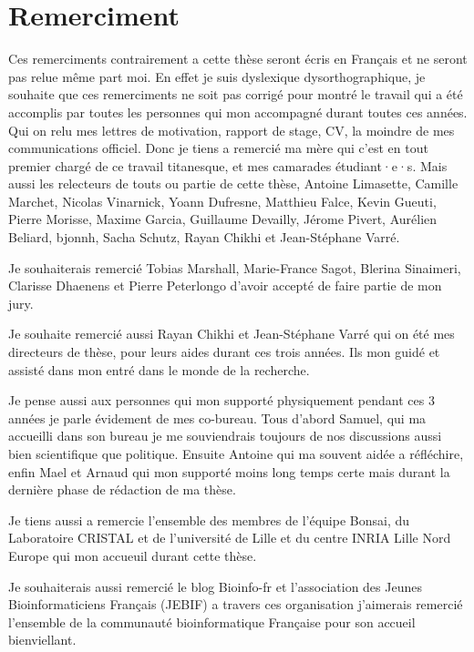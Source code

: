 \documentclass[main.tex]{subfiles}
\begin{document}
\section*{Remerciment}
%

Ces remerciments contrairement a cette thèse seront écris en Français et ne seront pas relue même part moi. En effet je suis dyslexique dysorthographique, je souhaite que ces remerciments ne soit pas corrigé pour montré le travail qui a été accomplis par toutes les personnes qui mon accompagné durant toutes ces années. Qui on relu mes lettres de motivation, rapport de stage, CV, la moindre de mes communications officiel. Donc je tiens a remercié ma mère qui c'est en tout premier chargé de ce travail titanesque, et mes camarades étudiant·e·s. Mais aussi les relecteurs de touts ou partie de cette thèse, Antoine Limasette, Camille Marchet, Nicolas Vinarnick, Yoann Dufresne, Matthieu Falce, Kevin Gueuti, Pierre Morisse, Maxime Garcia, Guillaume Devailly, Jérome Pivert, Aurélien Beliard, bjonnh, Sacha Schutz, Rayan Chikhi et Jean-Stéphane Varré.

Je souhaiterais remercié Tobias Marshall, Marie-France Sagot, Blerina Sinaimeri, Clarisse Dhaenens et Pierre Peterlongo d'avoir accepté de faire partie de mon jury.

Je souhaite remercié aussi Rayan Chikhi et Jean-Stéphane Varré qui on été mes directeurs de thèse, pour leurs aides durant ces trois années. Ils mon guidé et assisté dans mon entré dans le monde de la recherche.

Je pense aussi aux personnes qui mon supporté physiquement pendant ces 3 années je parle évidement de mes co-bureau. Tous d'abord Samuel, qui ma accueilli dans son bureau je me souviendrais toujours de nos discussions aussi bien scientifique que politique. Ensuite Antoine qui ma souvent aidée a réfléchire, enfin Mael et Arnaud qui mon supporté moins long temps certe mais durant la dernière phase de rédaction de ma thèse.

Je tiens aussi a remercie l'ensemble des membres de l'équipe Bonsai, du Laboratoire CRISTAL et de l'université de Lille et du centre INRIA Lille Nord Europe qui mon accueuil durant cette thèse.

Je souhaiterais aussi remercié le blog Bioinfo-fr et l'association des Jeunes Bioinformaticiens Français (JEBIF) a travers ces organisation j'aimerais remercié  l'ensemble de la communauté bioinformatique Française pour son accueil bienviellant.
\end{document}
